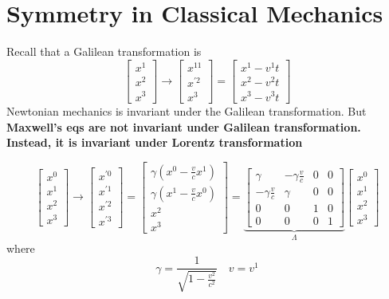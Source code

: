 \section{Symmetry in Classical Mechanics}
Recall that a Galilean transformation is
$$
\left[\begin{array}{c}
{x^{1}} \\
{x^{2}} \\
{x^{3}}
\end{array}\right] \rightarrow\left[\begin{array}{c}
{x^{11}} \\
{x^{\prime 2}} \\
{x^{3}}
\end{array}\right]=\left[\begin{array}{c}
{x^{1}-v^{1} t} \\
{x^{2}-v^{2} t} \\
{x^{3}-v^{3} t}
\end{array}\right]
$$
Newtonian mechanics is invariant under the Galilean transformation. But \textbf{Maxwell's eqs are not invariant under Galilean transformation. Instead, it is invariant under Lorentz transformation}
\begin{qt}
    \begin{equation}
\left[\begin{array}{c}
{x^{0}} \\
{x^{1}} \\
{x^{2}} \\
{x^{3}}
\end{array}\right] \rightarrow\left[\begin{array}{c}
{x^{\prime 0}} \\
{x^{\prime 1}} \\
{x^{\prime 2}} \\
{x^{\prime 3}}
\end{array}\right]=\left[\begin{array}{c}
{\gamma\left(x^{0}-\frac{v}{c} x^{1}\right)} \\
{\gamma\left(x^{1}-\frac{v}{c} x^{0}\right)} \\
{x^{2}} \\
{x^{3}}
\end{array}\right]=\underbrace{\left[\begin{array}{cccc}
{\gamma} & {-\gamma \frac{v}{c}} & {0} & {0} \\
{-\gamma \frac{v}{c}} & {\gamma} & {0} & {0} \\
{0} & {0} & {1} & {0} \\
{0} & {0} & {0} & {1}
\end{array}\right]}_{\Lambda}\left[\begin{array}{c}
{x^{0}} \\
{x^{1}} \\
{x^{2}} \\
{x^{3}}
\end{array}\right]
\label{lorentz-trans}
\end{equation}
where
$$
\gamma=\frac{1}{\sqrt{1-\frac{v^{2}}{c^{2}}}} \quad v=v^{1}
$$
\end{qt}
